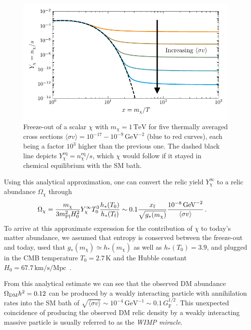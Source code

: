 \begin{figure}[t]
	\centering
	\includegraphics[width=\linewidth]{thesisplots/freezeout/freeze-out}
	\caption{Freeze-out of a scalar $\chi$ with $m_\chi = 1 \, \text{TeV}$ for five thermally averaged cross sections $\langle \sigma v \rangle = 10^{-17} - 10^{-9} \, \text{GeV}^{-2}$ (blue to red curves), each being a factor $10^3$ higher than the previous one. The dashed black line depicts $Y_\chi^\text{eq} = n_\chi^\text{eq}/s$, which $\chi$ would follow if it stayed in chemical equilibrium with the SM bath.}
	\label{fig:fo}
\end{figure}

Using this analytical approximation, one can convert the relic yield $Y_\chi^\infty$ to a relic abundance $\Omega_\chi$ through~\cite{Profumo:2017hqp}
\begin{align}
	\label{eq:FO}
	\Omega_\chi & = \frac{m_\chi}{3m_\text{Pl}^2 H_0^2} Y_{\chi}^\infty T_0^3 \frac{h_*(T_0)}{h_*(T_\text{f})} \sim 0.1 \frac{x_\text{f}}{\sqrt{g_*(m_\chi)}} \frac{10^{-8} \, \text{GeV}^{-2}}{\langle \sigma v \rangle} \, .
\end{align}
To arrive at this approximate expression for the contribution of $\chi$ to today's matter abundance, we assumed that entropy is conserved between the freeze-out and today, used that $g_*(m_\chi) \simeq h_*(m_\chi)$ as well as $h_*(T_0) = 3.9$, and plugged in the \ac{CMB} temperature $T_0 = 2.7 \, \text{K}$ and the Hubble constant $H_0 = 67.7 \, \text{km}/\text{s} / \text{Mpc}$~\cite{Planck:2018vyg}.

From this analytical estimate we can see that the observed \ac{DM} abundance $\Omega_{\text{DM}} h^2 = 0.12$ can be produced by a weakly interacting particle with annihilation rates  into the SM bath of $\sqrt{\langle \sigma v \rangle} \sim 10^{-4} \, \text{GeV}^{-1} \sim 0.1 \, G_\text{F}^{1/2}$. This unexpected coincidence of producing the observed \ac{DM} relic density by a weakly interacting massive particle is usually referred to as the \textit{\ac{WIMP} miracle}.

